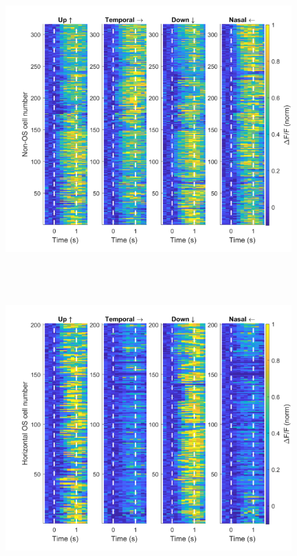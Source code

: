 \begin{figure}[H] \centering \includegraphics[width=11cm,height=11cm,keepaspectratio]{Figures/7.Results/finalPopulation/sel/popPlots_nonOS_centerOnly.png} 
\end{figure}

\begin{figure}[H] \centering \includegraphics[width=11cm,height=11cm,keepaspectratio]{Figures/7.Results/finalPopulation/sel/popPlots_horzOS_centerOnly.png} 
\end{figure}

